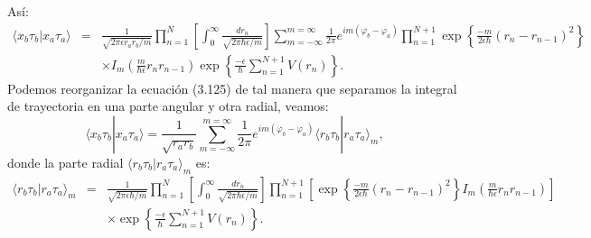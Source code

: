 Así:
\begin{eqnarray}
\nonumber \langle x_{b}\tau_{b}|x_{a}\tau_{a}\rangle &=& \frac{1}{\sqrt{2\pi\epsilon r_{a}r_{b}/m}}\prod_{n=1}^{N}\left[\int_{0}^{\infty}\frac{dr_{n}}{\sqrt{2\pi\hbar\epsilon/m}}\right]\sum_{m=-\infty}^{m=\infty}\frac{1}{2\pi}e^{im(\varphi_{b}-\varphi_{a})}\prod_{n=1}^{N+1}\exp\left\{ \frac{-m}{2\epsilon\hbar}(r_{n}-r_{n-1})^{2}\right\}\\
&& \times I_{m}\left(\frac{m}{\hbar\epsilon}r_{n}r_{n-1}\right)\exp\left\{ \frac{-\epsilon}{\hbar}\sum_{n=1}^{N+1}V(r_{n})\right\}. 
\end{eqnarray}
Podemos reorganizar la ecuación (3.125) de tal manera que separamos la integral de trayectoria en una parte angular y otra radial, veamos:
\begin{equation}
\langle x_{b}\tau_{b}|x_{a}\tau_{a}\rangle=\frac{1}{\sqrt{r_{a}r_{b}}}\sum_{m=-\infty}^{m=\infty}\frac{1}{2\pi}e^{im(\varphi_{b}-\varphi_{a})}\langle r_{b}\tau_{b}|r_{a}\tau_{a}\rangle_{m} ,
\end{equation}
donde la parte radial $\langle r_{b}\tau_{b}|r_{a}\tau_{a}\rangle_{m}$ es:
\begin{eqnarray}
\nonumber \langle r_{b}\tau_{b}|r_{a}\tau_{a}\rangle_{m}&=&\frac{1}{\sqrt{2\pi\epsilon\hbar/m}}\prod_{n=1}^{N}\left[\int_{0}^{\infty}\frac{dr_{n}}{\sqrt{2\pi\hbar\epsilon/m}}\right]\prod_{n=1}^{N+1}\left[\exp\left\{ \frac{-m}{2\epsilon\hbar}(r_{n}-r_{n-1})^{2}\right\} I_{m}\left(\frac{m}{\hbar\epsilon}r_{n}r_{n-1}\right)\right]\\
&&\times \exp\left\{ \frac{-\epsilon}{\hbar}\sum_{n=1}^{N+1}V(r_{n})\right\}.
\end{eqnarray}


